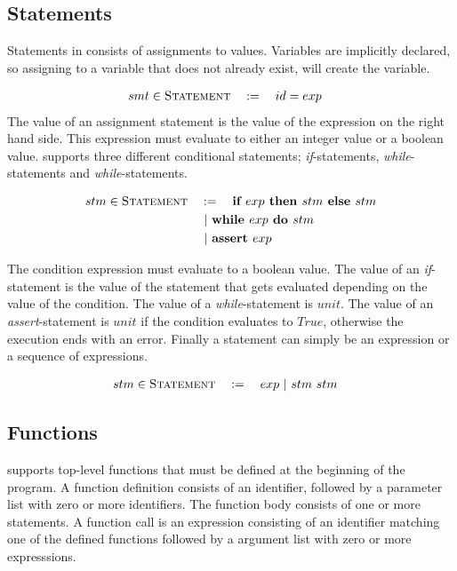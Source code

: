 \subsection{Statements}
Statements in \explanguage consists of assignments to values. Variables are implicitly declared, so assigning to a variable that does not already exist, will create the variable. 

\begin{alignat*}{3}
	smt & \in \textsc{Statement} && := \quad id  = exp 
\end{alignat*} 
The value of an assignment statement is the value of the expression on the right hand side. This expression must evaluate to either an integer value or a boolean value. \explanguage supports three different conditional statements;  \textsl{if}-statements, \textsl{while}-statements and \textsl{while}-statements. 

\begin{alignat*}{3}
	stm & \in \textsc{Statement} && := \quad \textbf{if }  exp \textbf{ then } stm \textbf{ else } stm\\
	& && \ | \  \textbf{while } exp \textbf{ do } stm\\
	& && \ | \  \textbf{assert } exp
\end{alignat*}

The condition expression must evaluate to a boolean value. The value of an \textsl{if}-statement is the value of the statement that gets evaluated depending on the value of the condition. The value of a \textsl{while}-statement is $unit$. The value of an \textsl{assert}-statement is $unit$ if the condition evaluates to $True$, otherwise the execution ends with an error. Finally a statement can simply be an expression or a sequence of expressions. 

\begin{alignat*}{3}
	stm & \in \textsc{Statement} && := \quad exp \alt stm \ stm
\end{alignat*}


\subsection{Functions}
\explanguage supports top-level functions that must be defined at the beginning of the program. A function definition consists of an identifier, followed by a parameter list with zero or more identifiers. The function body consists of one or more statements. A function call is an expression consisting of an identifier matching one of the defined functions followed by a argument list with zero or more expresssions. 

